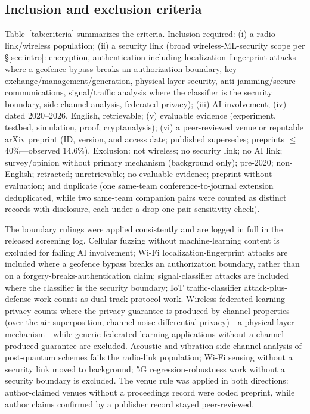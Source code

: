 \subsection{Inclusion and exclusion criteria}
Table~\ref{tab:criteria} summarizes the criteria. Inclusion required: (i) a radio-link/wireless population; (ii) a security link (broad wireless-ML-security scope per \S\ref{sec:intro}: encryption, authentication including localization-fingerprint attacks where a geofence bypass breaks an authorization boundary, key exchange/management/generation, physical-layer security, anti-jamming/secure communications, signal/traffic analysis where the classifier is the security boundary, side-channel analysis, federated privacy); (iii) AI involvement; (iv) dated 2020--2026, English, retrievable; (v) evaluable evidence (experiment, testbed, simulation, proof, cryptanalysis); (vi) a peer-reviewed venue or reputable arXiv preprint (ID, version, and access date; published supersedes; preprints $\le$40\%---observed 14.6\%). Exclusion: not wireless; no security link; no AI link; survey/opinion without primary mechanism (background only); pre-2020; non-English; retracted; unretrievable; no evaluable evidence; preprint without evaluation; and duplicate (one same-team conference-to-journal extension deduplicated, while two same-team companion pairs were counted as distinct records with disclosure, each under a drop-one-pair sensitivity check).

The boundary rulings were applied consistently and are logged in full in the released screening log. Cellular fuzzing without machine-learning content is excluded for failing AI involvement; Wi-Fi localization-fingerprint attacks are included where a geofence bypass breaks an authorization boundary, rather than on a forgery-breaks-authentication claim; signal-classifier attacks are included where the classifier is the security boundary; IoT traffic-classifier attack-plus-defense work counts as dual-track protocol work. Wireless federated-learning privacy counts where the privacy guarantee is produced by channel properties (over-the-air superposition, channel-noise differential privacy)---a physical-layer mechanism---while generic federated-learning applications without a channel-produced guarantee are excluded. Acoustic and vibration side-channel analysis of post-quantum schemes fails the radio-link population; Wi-Fi sensing without a security link moved to background; 5G regression-robustness work without a security boundary is excluded. The venue rule was applied in both directions: author-claimed venues without a proceedings record were coded preprint, while author claims confirmed by a publisher record stayed peer-reviewed.

